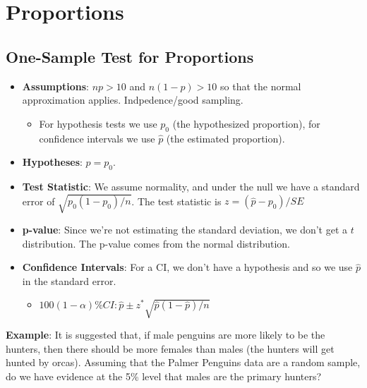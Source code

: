 \documentclass[
  letterpaper,
  DIV=11,
  numbers=noendperiod,
  oneside]{scrreprt}
\providecommand{\tightlist}{%
  \setlength{\itemsep}{0pt}\setlength{\parskip}{0pt}}\usepackage{longtable,booktabs,array}
\begin{document}
\hypertarget{proportions}{%
\section{Proportions}\label{proportions}}

\hypertarget{one-sample-test-for-proportions}{%
\subsection{One-Sample Test for
Proportions}\label{one-sample-test-for-proportions}}

\begin{itemize}
\tightlist
\item
  \textbf{Assumptions}: \(np > 10\) and \(n(1 - p)>10\) so that the
  normal approximation applies. Indpedence/good sampling.

  \begin{itemize}
  \tightlist
  \item
    For hypothesis tests we use \(p_0\) (the hypothesized proportion),
    for confidence intervals we use \(\hat p\) (the estimated
    proportion).
  \end{itemize}
\item
  \textbf{Hypotheses}: \(p = p_0\).
\item
  \textbf{Test Statistic}: We assume normality, and under the null we
  have a standard error of \(\sqrt{p_0(1 - p_0)/n}\). The test statistic
  is \(z = (\hat p - p_0)/SE\)
\item
  \textbf{p-value}: Since we're not estimating the standard deviation,
  we don't get a \(t\) distribution. The p-value comes from the normal
  distribution.
\item
  \textbf{Confidence Intervals}: For a CI, we don't have a hypothesis
  and so we use \(\hat p\) in the standard error.

  \begin{itemize}
  \tightlist
  \item
    \(100(1-\alpha)\%CI: \hat p \pm z^*\sqrt{\hat p(1 - \hat p)/n}\)
  \end{itemize}
\end{itemize}

\textbf{Example}: It is suggested that, if male penguins are more likely
to be the hunters, then there should be more females than males (the
hunters will get hunted by orcas). Assuming that the Palmer Penguins
data are a random sample, do we have evidence at the 5\% level that
males are the primary hunters?
\end{document}

